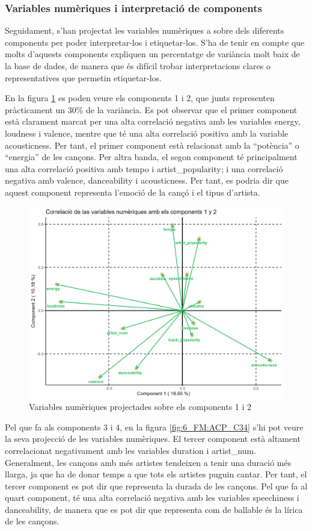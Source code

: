 \subsubsection{Variables numèriques i interpretació de components}

Seguidament, s'han projectat les variables numèriques a sobre dels diferents components per poder interpretar-los i etiquetar-los. S'ha de tenir en compte que molts d'aquests components expliquen un percentatge de variància molt baix de la base de dades, de manera que és difícil trobar interpretacions clares o representatives que permetin etiquetar-los.

En la figura \ref{fig:6_FM:ACP_C12} es poden veure els components 1 i 2, que junts representen pràcticament un 30\% de la variància. Es pot observar que el primer component està clarament marcat per una alta correlació negativa amb les variables energy, loudness i valence, mentre que té una alta correlació positiva amb la variable acousticness. Per tant, el primer component està relacionat amb la ``potència'' o ``energia'' de les cançons. Per altra banda, el segon component té principalment una alta correlació positiva amb tempo i artist\_popularity; i una correlació negativa amb valence, danceability i acousticness. Per tant, es podria dir que aquest component representa l'emoció de la cançó i el tipus d'artista.

\begin{figure}[H]
    \centering
    \includegraphics[width=0.8\linewidth]{Images/6_Factorial_Methods/ACP/Num_C1_C2.png}
    \caption{Variables numèriques projectades sobre els components 1 i 2}
    \label{fig:6_FM:ACP_C12}
\end{figure}

Pel que fa als components 3 i 4, en la figura \ref{fig:6_FM:ACP_C34} s'hi pot veure la seva projecció de les variables numèriques. El tercer component està altament correlacionat negativament amb les variables duration i artist\_num. Generalment, les cançons amb més artistes tendeixen a tenir una duració més llarga, ja que ha de donar temps a que tots els artistes puguin cantar. Per tant, el tercer component es pot dir que representa la durada de les cançons. Pel que fa al quart component, té una alta correlació negativa amb les variables speechiness i danceability, de manera que es pot dir que representa com de ballable és la lírica de les cançons.

